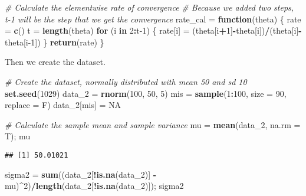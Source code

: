 \documentclass[]{article}
\newenvironment{Shaded}{\begin{snugshade}}{\end{snugshade}}
\newcommand{\CommentTok}[1]{\textcolor[rgb]{0.56,0.35,0.01}{\textit{#1}}}
\newcommand{\ControlFlowTok}[1]{\textcolor[rgb]{0.13,0.29,0.53}{\textbf{#1}}}
\newcommand{\DataTypeTok}[1]{\textcolor[rgb]{0.13,0.29,0.53}{#1}}
\newcommand{\DecValTok}[1]{\textcolor[rgb]{0.00,0.00,0.81}{#1}}
\newcommand{\KeywordTok}[1]{\textcolor[rgb]{0.13,0.29,0.53}{\textbf{#1}}}
\newcommand{\NormalTok}[1]{#1}
\newcommand{\OperatorTok}[1]{\textcolor[rgb]{0.81,0.36,0.00}{\textbf{#1}}}
\newcommand{\OtherTok}[1]{\textcolor[rgb]{0.56,0.35,0.01}{#1}}
\newcommand{\StringTok}[1]{\textcolor[rgb]{0.31,0.60,0.02}{#1}}
\begin{document}
\begin{Shaded}
\begin{Highlighting}[]
\CommentTok{# Calculate the elementwise rate of convergence}
\CommentTok{# Because we added two steps, t-1 will be the step that we get the convergence}
\NormalTok{rate_cal =}\StringTok{ }\ControlFlowTok{function}\NormalTok{(theta) \{}
\NormalTok{  rate =}\StringTok{ }\KeywordTok{c}\NormalTok{()}
\NormalTok{  t =}\StringTok{ }\KeywordTok{length}\NormalTok{(theta)}
  \ControlFlowTok{for}\NormalTok{ (i }\ControlFlowTok{in} \DecValTok{2}\OperatorTok{:}\NormalTok{t}\DecValTok{-1}\NormalTok{) \{}
\NormalTok{    rate[i] =}\StringTok{ }\NormalTok{(theta[i}\OperatorTok{+}\DecValTok{1}\NormalTok{]}\OperatorTok{-}\NormalTok{theta[i])}\OperatorTok{/}\NormalTok{(theta[i]}\OperatorTok{-}\NormalTok{theta[i}\DecValTok{-1}\NormalTok{])}
\NormalTok{  \}}
  \KeywordTok{return}\NormalTok{(rate)}
\NormalTok{\}}
\end{Highlighting}
\end{Shaded}

Then we create the dataset.

\begin{Shaded}
\begin{Highlighting}[]
\CommentTok{# Create the dataset, normally distributed with mean 50 and sd 10}
\KeywordTok{set.seed}\NormalTok{(}\DecValTok{1029}\NormalTok{)}
\NormalTok{data_}\DecValTok{2}\NormalTok{ =}\StringTok{ }\KeywordTok{rnorm}\NormalTok{(}\DecValTok{100}\NormalTok{, }\DecValTok{50}\NormalTok{, }\DecValTok{5}\NormalTok{)}
\NormalTok{mis =}\StringTok{ }\KeywordTok{sample}\NormalTok{(}\DecValTok{1}\OperatorTok{:}\DecValTok{100}\NormalTok{, }\DataTypeTok{size =} \DecValTok{90}\NormalTok{, }\DataTypeTok{replace =}\NormalTok{ F)}
\NormalTok{data_}\DecValTok{2}\NormalTok{[mis] =}\StringTok{ }\OtherTok{NA}

\CommentTok{# Calculate the sample mean and sample variance}
\NormalTok{mu =}\StringTok{ }\KeywordTok{mean}\NormalTok{(data_}\DecValTok{2}\NormalTok{, }\DataTypeTok{na.rm =}\NormalTok{ T); mu}
\end{Highlighting}
\end{Shaded}

\begin{verbatim}
## [1] 50.01021
\end{verbatim}

\begin{Shaded}
\begin{Highlighting}[]
\NormalTok{sigma2 =}\StringTok{ }\KeywordTok{sum}\NormalTok{((data_}\DecValTok{2}\NormalTok{[}\OperatorTok{!}\KeywordTok{is.na}\NormalTok{(data_}\DecValTok{2}\NormalTok{)] }\OperatorTok{-}\StringTok{ }\NormalTok{mu)}\OperatorTok{^}\DecValTok{2}\NormalTok{)}\OperatorTok{/}\KeywordTok{length}\NormalTok{(data_}\DecValTok{2}\NormalTok{[}\OperatorTok{!}\KeywordTok{is.na}\NormalTok{(data_}\DecValTok{2}\NormalTok{)]); sigma2}
\end{Highlighting}
\end{Shaded}
\end{document}
